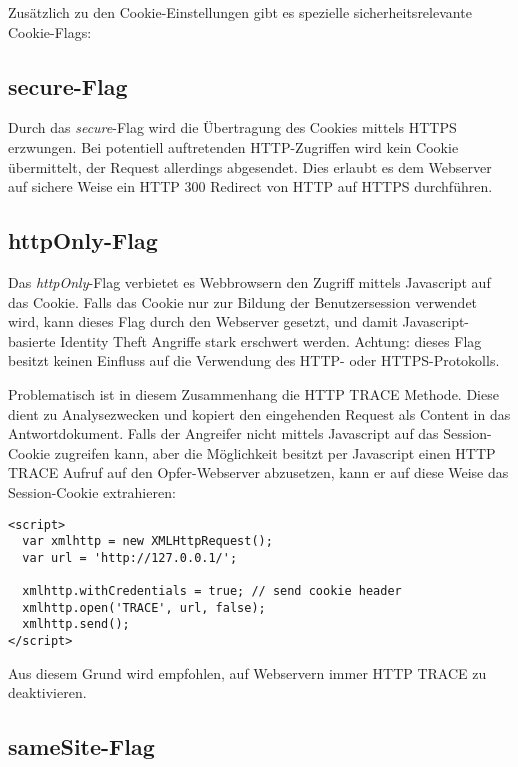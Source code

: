Zusätzlich zu den Cookie-Einstellungen gibt es spezielle sicherheitsrelevante Cookie-Flags:

\subsection{secure-Flag}

Durch das \textit{secure}-Flag wird die Übertragung des Cookies mittels HTTPS erzwungen. Bei potentiell auftretenden HTTP-Zugriffen wird kein Cookie übermittelt, der Request allerdings abgesendet. Dies erlaubt es dem Webserver auf sichere Weise ein HTTP 300 Redirect von HTTP auf HTTPS durchführen.

\subsection{httpOnly-Flag}

Das \textit{httpOnly}-Flag verbietet es Webbrowsern den Zugriff mittels Javascript auf das Cookie. Falls das Cookie nur zur Bildung der Benutzersession verwendet wird, kann dieses Flag durch den Webserver gesetzt, und damit Javascript-basierte Identity Theft Angriffe stark erschwert werden. Achtung: dieses Flag besitzt keinen Einfluss auf die Verwendung des HTTP- oder HTTPS-Protokolls.

Problematisch ist in diesem Zusammenhang die HTTP TRACE Methode. Diese dient zu Analysezwecken und kopiert den eingehenden Request als Content in das Antwortdokument. Falls der Angreifer nicht mittels Javascript auf das Session-Cookie zugreifen kann, aber die Möglichkeit besitzt per Javascript einen HTTP TRACE Aufruf auf den Opfer-Webserver abzusetzen, kann er auf diese Weise das Session-Cookie extrahieren:

\begin{verbatim}
<script>
  var xmlhttp = new XMLHttpRequest();
  var url = 'http://127.0.0.1/';

  xmlhttp.withCredentials = true; // send cookie header
  xmlhttp.open('TRACE', url, false);
  xmlhttp.send();
</script>
\end{verbatim}

Aus diesem Grund wird empfohlen, auf Webservern immer HTTP TRACE zu deaktivieren.

\subsection{sameSite-Flag}
\label{session_cookies_samesite}

